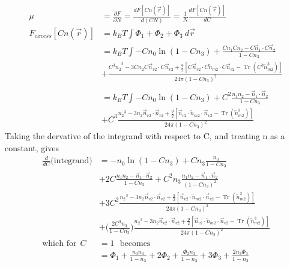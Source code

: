 \documentclass[double,12pt]{revtex4-2}
\begin{document}
\begin{align}
  \mu &= \frac{\partial F}{\partial N} = \frac{dF[Cn(\vec r)]}{d(CN)} = \frac{1}{N}\frac{dF[Cn(\vec r)]}{dC}\\
   F_{excess}[Cn(\vec r)] &= k_BT\int \Phi_1 +\Phi_2+\Phi_3 ~d\vec r \\
   &= k_BT\int -Cn_0\ln\left(1-Cn_3\right) + \frac{Cn_1Cn_2-C\vec n_1\cdot C\vec n_2}{1-Cn_3} \nonumber \\
   &+ \frac{{C^3n_2}^3-3Cn_2C\vec n_{v2}\cdot C\vec n_{v2}+\frac{9}{2}
       [C\vec n_{v2}\cdot{C\overleftrightarrow{n}_{m2}}\cdot{C\vec n_{v2}}
       -\operatorname{Tr}({C^3\overleftrightarrow n^3_{m2}})]}{24\pi(1-Cn_3)^2}    \\ \nonumber\\
   &= k_BT\int -Cn_0\ln\left(1-Cn_3\right) + C^2\frac{n_1n_2-\vec n_1\cdot \vec n_2}{1-Cn_3} \nonumber \\
   &+ C^3\frac{{n_2}^3-3n_2\vec n_{v2}\cdot \vec n_{v2}+\frac{9}{2}
       [\vec n_{v2}\cdot{\overleftrightarrow{n}_{m2}}\cdot{\vec n_{v2}}
       -\operatorname{Tr}({\overleftrightarrow n^3_{m2}})]}{24\pi(1-Cn_3)^2}    
\end{align} 
Taking the dervative of the integrand with respect to C, and treating n 
as a constant, gives
\begin{align} 
  \frac{d}{dC}\Bigg(\text{integrand}\Bigg)    &= -n_0\ln\left(1-Cn_3\right) + Cn_3\frac{n_0}{1-Cn_3} \nonumber \\
   &+ 2C\frac{n_1n_2-\vec n_1\cdot\vec n_2}{1-Cn_3} +C^2n_3 \frac{n_1n_2-\vec n_1\cdot\vec n_2}{(1-Cn_3)^2} \nonumber \\   
   &+ 3C^2\frac{{n_2}^3-3n_2\vec n_{v2}\cdot \vec n_{v2} 
   + \frac{9}{2}[\vec n_{v2}\cdot{\overleftrightarrow{n}_{m2}}\cdot{\vec n_{v2}} 
       -\operatorname{Tr}({\overleftrightarrow n^3_{m2}})]}{24\pi(1-Cn_3)^2}  \nonumber  \\ 
    &+ \Bigg(\frac{2C^3n_3}{1-Cn_3}\Bigg)\frac{{n_2}^3-3n_2\vec n_{v2}\cdot \vec n_{v2} 
    + \frac{9}{2}[\vec n_{v2}\cdot{\overleftrightarrow{n}_{m2}}\cdot{\vec n_{v2}}   
      -\operatorname{Tr}({\overleftrightarrow n^3_{m2}})]}{24\pi(1-Cn_3)^2}     \\
    \text{which for} ~~C&=1~~~\text{becomes}~~~ \nonumber\\
    &= \Phi_1 + \frac{n_0n_3}{1-n_3} + 2\Phi_2 + \frac{\Phi_2 n_3}{1-n_3} + 3\Phi_3 + \frac{2n_3\Phi_3}{1-n_3} 
\end{align} 
\end{document}

